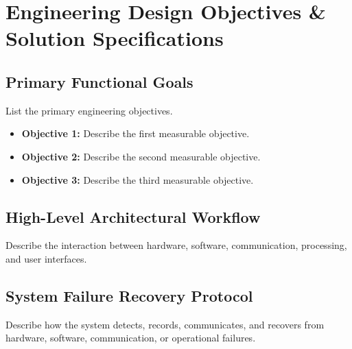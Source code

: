 
\section{Engineering Design Objectives \& Solution Specifications}

\subsection{Primary Functional Goals}

List the primary engineering objectives.

\begin{itemize}
    \item \textbf{Objective 1:} Describe the first measurable objective.
    \item \textbf{Objective 2:} Describe the second measurable objective.
    \item \textbf{Objective 3:} Describe the third measurable objective.
\end{itemize}

\subsection{High-Level Architectural Workflow}

Describe the interaction between hardware, software, communication,
processing, and user interfaces.

\subsection{System Failure Recovery Protocol}

Describe how the system detects, records, communicates, and recovers from
hardware, software, communication, or operational failures.
